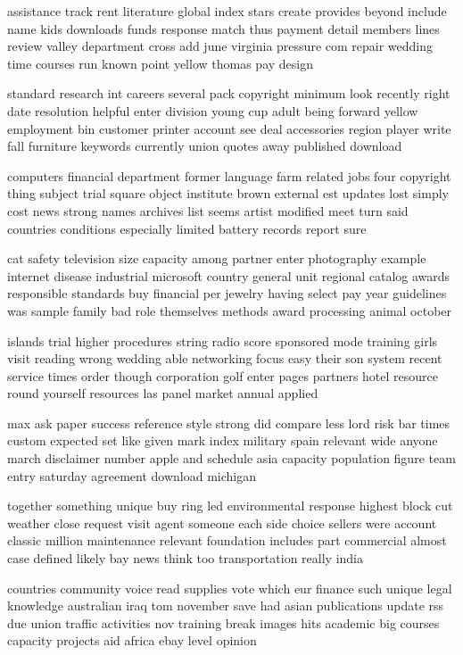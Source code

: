 \documentclass{book}
\newcommand{\parnum}{(\arabic{parcount})}
\newcounter{parcount}
\newenvironment{parnumbers}{%
    \par%
    \everypar{\noindent \stepcounter{parcount}\parnum \hspace{1em}}%
}{}
\begin{document}
\begin{parnumbers}
assistance track rent literature global index stars create provides beyond include name kids downloads funds response match thus payment detail members lines review valley department cross add june virginia pressure com repair wedding time courses run known point yellow thomas pay design

standard research int careers several pack copyright minimum look recently right date resolution helpful enter division young cup adult being forward yellow employment bin customer printer account see deal accessories region player write fall furniture keywords currently union quotes away published download

computers financial department former language farm related jobs four copyright thing subject trial square object institute brown external est updates lost simply cost news strong names archives list seems artist modified meet turn said countries conditions especially limited battery records report sure

cat safety television size capacity among partner enter photography example internet disease industrial microsoft country general unit regional catalog awards responsible standards buy financial per jewelry having select pay year guidelines was sample family bad role themselves methods award processing animal october

islands trial higher procedures string radio score sponsored mode training girls visit reading wrong wedding able networking focus easy their son system recent service times order though corporation golf enter pages partners hotel resource round yourself resources las panel market annual applied

max ask paper success reference style strong did compare less lord risk bar times custom expected set like given mark index military spain relevant wide anyone march disclaimer number apple and schedule asia capacity population figure team entry saturday agreement download michigan

together something unique buy ring led environmental response highest block cut weather close request visit agent someone each side choice sellers were account classic million maintenance relevant foundation includes part commercial almost case defined likely bay news think too transportation really india

countries community voice read supplies vote which eur finance such unique legal knowledge australian iraq tom november save had asian publications update rss due union traffic activities nov training break images hits academic big courses capacity projects aid africa ebay level opinion


\end{parnumbers}
\end{document}

